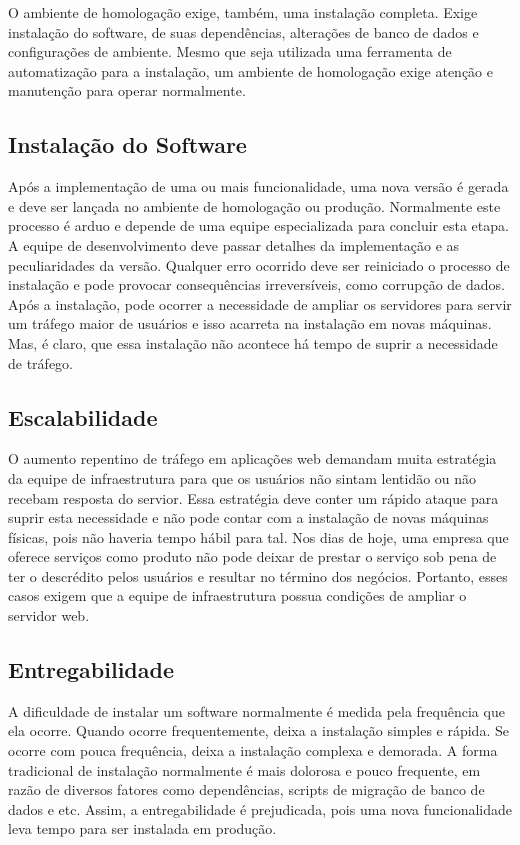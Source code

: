 \documentclass[
	12pt,				%
	openright,			%
	oneside,			%
	a4paper,			%
	chapter=TITLE,		%
	section=TITLE,		%
	english,			%
	french,				%
	spanish,			%
	brazil				%
	]{abntex2}
\begin{document}
O ambiente de homologação exige, também, uma instalação completa. Exige instalação do software, de suas dependências, alterações de banco de dados e configurações de ambiente. Mesmo que seja utilizada uma ferramenta de automatização para a instalação, um ambiente de homologação exige atenção e manutenção para operar normalmente.

\subsection{Instalação do Software}

Após a implementação de uma ou mais funcionalidade, uma nova versão é gerada e deve ser lançada no ambiente de homologação ou produção. Normalmente este processo é arduo e depende de uma equipe especializada para concluir esta etapa. A equipe de desenvolvimento deve passar detalhes da implementação e as peculiaridades da versão. Qualquer erro ocorrido deve ser reiniciado o processo de instalação e pode provocar consequências irreversíveis, como corrupção de dados. Após a instalação, pode ocorrer a necessidade de ampliar os servidores para servir um tráfego maior de usuários e isso acarreta na instalação em novas máquinas. Mas, é claro, que essa instalação não acontece há tempo de suprir a necessidade de tráfego.

\subsection{Escalabilidade}

O aumento repentino de tráfego em aplicações web demandam muita estratégia da equipe de infraestrutura para que os usuários não sintam lentidão ou não recebam resposta do servior. Essa estratégia deve conter um rápido ataque para suprir esta necessidade e não pode contar com a instalação de novas máquinas físicas, pois não haveria tempo hábil para tal. Nos dias de hoje, uma empresa que oferece serviços como produto não pode deixar de prestar o serviço sob pena de ter o descrédito pelos usuários e resultar no término dos negócios. Portanto, esses casos exigem que a equipe de infraestrutura possua condições de ampliar o servidor web.

\subsection{Entregabilidade}

A dificuldade de instalar um software normalmente é medida pela frequência que ela ocorre. Quando ocorre frequentemente, deixa a instalação simples e rápida. Se ocorre com pouca frequência, deixa a instalação complexa e demorada. A forma tradicional de instalação normalmente é mais dolorosa e pouco frequente, em razão de diversos fatores como dependências, scripts de migração de banco de dados e etc. Assim, a entregabilidade é prejudicada, pois uma nova funcionalidade leva tempo para ser instalada em produção.
\end{document}
